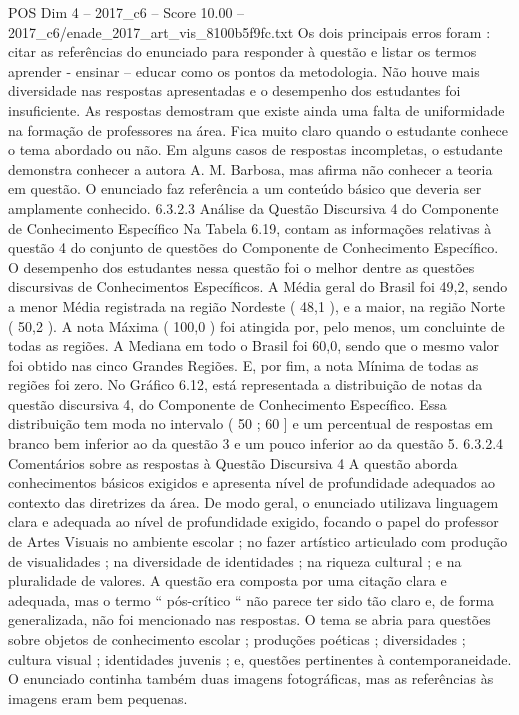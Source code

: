 \begin{textsample}{POS Dim 4 – 2017\_c6 – Score 10.00 – 2017\_c6/enade\_2017\_art\_vis\_8100b5f9fc.txt}
Os dois principais erros foram : citar as referências do enunciado para responder à questão e listar os termos aprender - ensinar – educar como os pontos da metodologia.
Não houve mais diversidade nas respostas apresentadas e o desempenho dos estudantes foi insuficiente.
As respostas demostram que existe ainda uma falta de uniformidade na formação de professores na área.
Fica muito claro quando o estudante conhece o tema abordado ou não.
Em alguns casos de respostas incompletas, o estudante demonstra conhecer a autora A.
M.
Barbosa, mas afirma não conhecer a teoria em questão.
O enunciado faz referência a um conteúdo básico que deveria ser amplamente conhecido. 6.3.2.3 Análise da Questão Discursiva 4 do Componente de Conhecimento Específico Na Tabela 6.19, contam as informações relativas à questão 4 do conjunto de questões do Componente de Conhecimento Específico.
O desempenho dos estudantes nessa questão foi o melhor dentre as questões discursivas de Conhecimentos Específicos.
A Média geral do Brasil foi 49,2, sendo a menor Média registrada na região Nordeste ( 48,1 ), e a maior, na região Norte ( 50,2 ).
A nota Máxima ( 100,0 ) foi atingida por, pelo menos, um concluinte de todas as regiões.
A Mediana em todo o Brasil foi 60,0, sendo que o mesmo valor foi obtido nas cinco Grandes Regiões.
E, por fim, a nota Mínima de todas as regiões foi zero.
No Gráfico 6.12, está representada a distribuição de notas da questão discursiva 4, do Componente de Conhecimento Específico.
Essa distribuição tem moda no intervalo ( 50 ; 60 ] e um percentual de respostas em branco bem inferior ao da questão 3 e um pouco inferior ao da questão 5. 6.3.2.4 Comentários sobre as respostas à Questão Discursiva 4 A questão aborda conhecimentos básicos exigidos e apresenta nível de profundidade adequados ao contexto das diretrizes da área.
De modo geral, o enunciado utilizava linguagem clara e adequada ao nível de profundidade exigido, focando o papel do professor de Artes Visuais no ambiente escolar ; no fazer artístico articulado com produção de visualidades ; na diversidade de identidades ; na riqueza cultural ; e na pluralidade de valores.
A questão era composta por uma citação clara e adequada, mas o termo “ pós-crítico “ não parece ter sido tão claro e, de forma generalizada, não foi mencionado nas respostas.
O tema se abria para questões sobre objetos de conhecimento escolar ; produções poéticas ; diversidades ; cultura visual ; identidades juvenis ; e, questões pertinentes à contemporaneidade.
O enunciado continha também duas imagens fotográficas, mas as referências às imagens eram bem pequenas.

\end{textsample}
